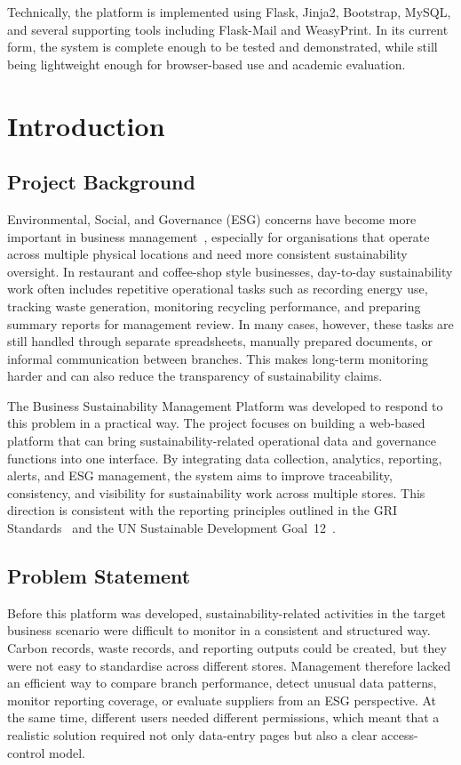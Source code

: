 \documentclass[11pt,a4paper]{article}
\begin{document}
Technically, the platform is implemented using Flask, Jinja2, Bootstrap, MySQL, and several supporting tools including Flask-Mail and WeasyPrint. In its current form, the system is complete enough to be tested and demonstrated, while still being lightweight enough for browser-based use and academic evaluation.

\section{Introduction}

\subsection{Project Background}
Environmental, Social, and Governance (ESG) concerns have become more important in business management~\cite{eccles2014}, especially for organisations that operate across multiple physical locations and need more consistent sustainability oversight. In restaurant and coffee-shop style businesses, day-to-day sustainability work often includes repetitive operational tasks such as recording energy use, tracking waste generation, monitoring recycling performance, and preparing summary reports for management review. In many cases, however, these tasks are still handled through separate spreadsheets, manually prepared documents, or informal communication between branches. This makes long-term monitoring harder and can also reduce the transparency of sustainability claims.

The Business Sustainability Management Platform was developed to respond to this problem in a practical way. The project focuses on building a web-based platform that can bring sustainability-related operational data and governance functions into one interface. By integrating data collection, analytics, reporting, alerts, and ESG management, the system aims to improve traceability, consistency, and visibility for sustainability work across multiple stores. This direction is consistent with the reporting principles outlined in the GRI Standards~\cite{gri2021} and the UN Sustainable Development Goal~12~\cite{un_sdg12}.

\subsection{Problem Statement}
Before this platform was developed, sustainability-related activities in the target business scenario were difficult to monitor in a consistent and structured way. Carbon records, waste records, and reporting outputs could be created, but they were not easy to standardise across different stores. Management therefore lacked an efficient way to compare branch performance, detect unusual data patterns, monitor reporting coverage, or evaluate suppliers from an ESG perspective. At the same time, different users needed different permissions, which meant that a realistic solution required not only data-entry pages but also a clear access-control model.
\end{document}
